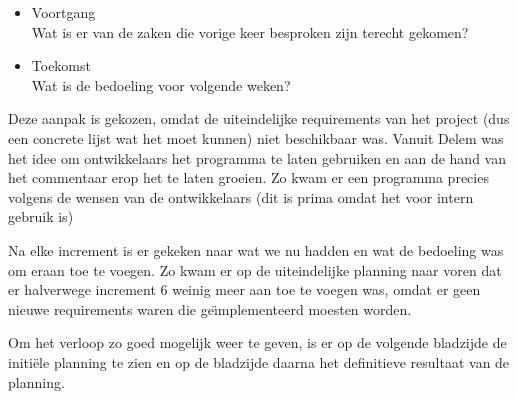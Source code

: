 \begin{itemize}
\item Voortgang \\
Wat is er van de zaken die vorige keer besproken zijn terecht gekomen?
\item Toekomst \\
Wat is de bedoeling voor volgende weken?
\end{itemize}

Deze aanpak is gekozen, omdat de uiteindelijke requirements van het project (dus een concrete lijst wat het moet kunnen) niet beschikbaar was. Vanuit Delem was het idee om ontwikkelaars het programma te laten gebruiken en aan de hand van het commentaar erop het te laten groeien. Zo kwam er een programma precies volgens de wensen van de ontwikkelaars (dit is prima omdat het voor intern gebruik is)

Na elke increment is er gekeken naar wat we nu hadden en wat de bedoeling was om eraan toe te voegen. Zo kwam er op de uiteindelijke planning naar voren dat er halverwege increment 6 weinig meer aan toe te voegen was, omdat er geen nieuwe requirements waren die ge\"\i mplementeerd moesten worden.

Om het verloop zo goed mogelijk weer te geven, is er op de volgende bladzijde de initi\"ele planning te zien en op de bladzijde daarna het definitieve resultaat van de planning.

